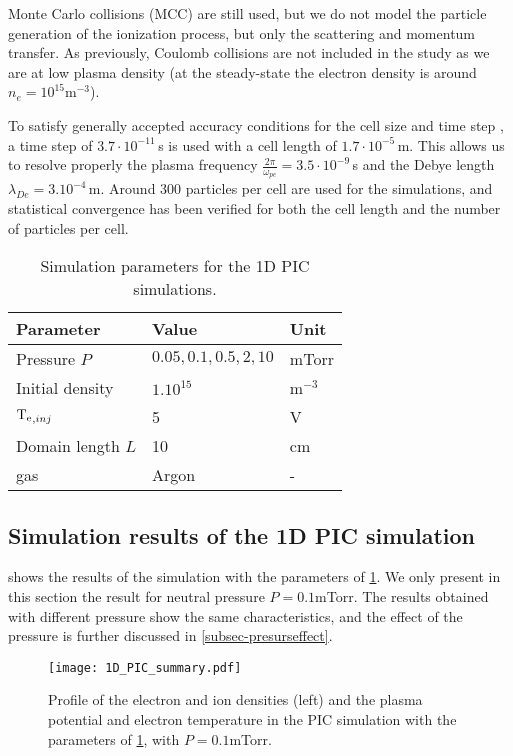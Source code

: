     Monte Carlo collisions (MCC) are still used, but we do not model the particle generation of the ionization process, but only the scattering and momentum transfer.
    As previously, Coulomb collisions are not included in the study as we are at low plasma density (at the steady-state the electron density is around $n_e = 10^{15}$m$^{-3}$).

    To satisfy generally accepted accuracy conditions for the cell size and time step \citep{turner2013}, a time step of $3.7\cdot10^{-11}$\,s is used with a cell length of $1.7\cdot10^{-5}$\,m.
    This allows us to resolve properly the plasma frequency $\frac{2 \pi}{\omega_{pe}} = 3.5\cdot10^{-9} $\,s and the Debye length $\lambda_{De} = 3.10^{-4}$\,m.
    Around $300$ particles per cell are used for the simulations, and statistical convergence has been verified for both the cell length and the number of particles per cell.


    \begin{table}
      \centering
      \begin{tabular}{lll}  \toprule
        Parameter & Value & Unit  \\ \midrule
        Pressure $P$ & $0.05,0.1,0.5, 2, 10$ & mTorr\\
        Initial density & $1 .10^{15}$ & m$^{-3}$\\
        $\mathrm{T_e}_{, inj}$& 5 & V\\
        Domain length $L$ & 10 & cm\\
        gas & Argon & -\\
        \bottomrule
      \end{tabular}
      \caption{Simulation parameters for the 1D PIC simulations.}
      \label{tab_1DPICParams}
    \end{table}


  \subsection{Simulation results of the \ac{1D} \ac{PIC} simulation} \label{subsec-1DPIC_results}

     shows the results of the simulation with the parameters of \cref{tab_1DPICParams}.
    We only present in this section the result for neutral pressure $P=0.1$mTorr.
    The results obtained with different pressure show the same characteristics, and the effect of the pressure is further discussed in \cref{subsec-presurseffect}.
    
    \begin{figure}[htbp]
      \centering
      \texttt{[image: 1D\_PIC\_summary.pdf]}
      \caption{Profile of the electron and ion densities (left) and the plasma potential and electron temperature in the PIC simulation with the parameters of \cref{tab_1DPICParams}, with $P=0.1$mTorr.}
      \label{fig-PIC1}
    \end{figure}


